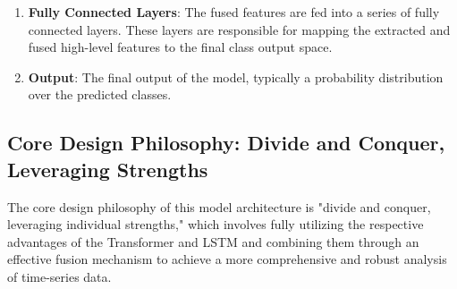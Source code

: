 \begin{enumerate}
    \item \textbf{Fully Connected Layers}: The fused features are fed into a series of fully connected layers. These layers are responsible for mapping the extracted and fused high-level features to the final class output space.
    \item \textbf{Output}: The final output of the model, typically a probability distribution over the predicted classes.
\end{enumerate}

\subsection{Core Design Philosophy: Divide and Conquer, Leveraging Strengths}

The core design philosophy of this model architecture is "divide and conquer, leveraging individual strengths," which involves fully utilizing the respective advantages of the Transformer and LSTM and combining them through an effective fusion mechanism to achieve a more comprehensive and robust analysis of time-series data.

